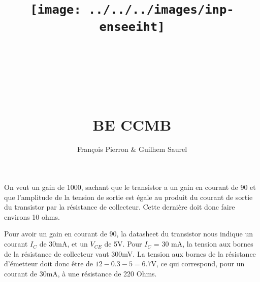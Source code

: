 \documentclass{article}
\title{\texttt{[image: ../../../images/inp-enseeiht]} \\ ~ \\ ~ \\ ~ \\ ~ \\ BE CCMB}
\author{François Pierron \& Guilhem Saurel}
\date{\oldstylenums{\today}}
\begin{document}
\begin{titlepage}
    \setcounter{page}{0}
    \maketitle
    \thispagestyle{empty}
\end{titlepage}

\tableofcontents

On veut un gain de 1000, sachant que le transistor a un gain en courant de 90 et que l’amplitude de la tension de sortie est égale au produit du courant de sortie du transistor par la résistance de collecteur. Cette dernière doit donc faire environs 10 ohms.

Pour avoir un gain en courant de 90, la datasheet du transistor nous indique un courant $I_C$ de 30mA, et un $V_{CE}$ de 5V.
Pour $I_C$ = 30 mA, la tension aux bornes de la résistance de collecteur vaut 300mV. La tension aux bornes de la résistance d’émetteur doit donc être de $12-0.3-5=6.7$V, ce qui correspond, pour un courant de 30mA, à une résistance de 220 Ohms.
\end{document}
